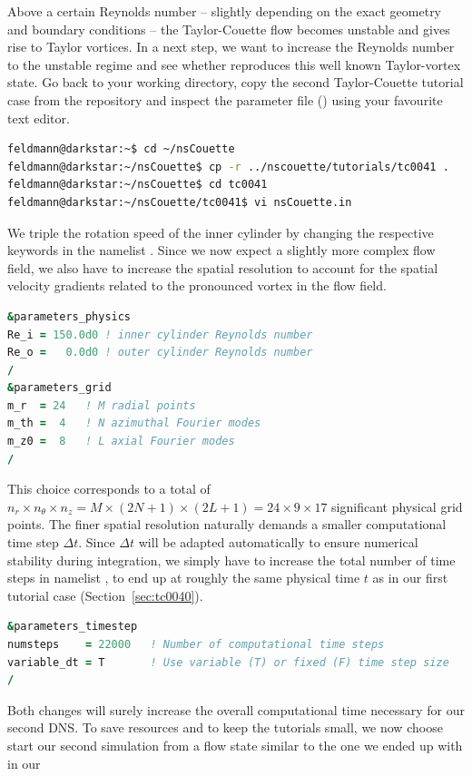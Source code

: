 \documentclass[a4paper, 11pt, DIV=11]{scrartcl}
\begin{document}
Above a certain Reynolds number -- slightly depending on the exact geometry and
boundary conditions -- the Taylor-Couette flow becomes unstable and gives rise
to Taylor vortices. In a next step, we want to increase the Reynolds number to
the unstable regime and see whether \nsc reproduces this well known Taylor-vortex
state. Go back to your working directory, copy the second Taylor-Couette tutorial
case from the repository and inspect the parameter file ()
using your favourite text editor.
\begin{lstlisting}[language=bash]
feldmann@darkstar:~$ cd ~/nsCouette
feldmann@darkstar:~/nsCouette$ cp -r ../nscouette/tutorials/tc0041 .
feldmann@darkstar:~/nsCouette$ cd tc0041
feldmann@darkstar:~/nsCouette/tc0041$ vi nsCouette.in
\end{lstlisting}
We triple the rotation speed of the inner cylinder by changing the respective
keywords in the namelist . Since we now expect a slightly
more complex flow field, we also have to increase the spatial resolution to
account for the spatial velocity gradients related to the pronounced vortex
in the flow field.
\begin{lstlisting}[language=Fortran]
&parameters_physics
Re_i = 150.0d0 ! inner cylinder Reynolds number
Re_o =   0.0d0 ! outer cylinder Reynolds number
/
&parameters_grid
m_r  = 24   ! M radial points
m_th =  4   ! N azimuthal Fourier modes
m_z0 =  8   ! L axial Fourier modes
/
\end{lstlisting}
This choice corresponds to a total of $n_r \times n_\theta  \times n_z=M \times
(2N+1) \times (2L+1) = \num{24} \times \num{9} \times \num{17}$ significant
physical grid points. The finer spatial resolution naturally demands a smaller
computational time step $\Delta t$. Since $\Delta t$ will be adapted automatically
to ensure numerical stability during integration, we simply have to increase the
total number of time steps in namelist , to end up at
roughly the same physical time $t$ as in our first tutorial case
(Section~\ref{sec:tc0040}).
\begin{lstlisting}[language=Fortran]
&parameters_timestep
numsteps    = 22000   ! Number of computational time steps
variable_dt = T       ! Use variable (T) or fixed (F) time step size
/
\end{lstlisting}
Both changes will
surely increase the overall computational time necessary for our second DNS.
To save resources and to keep the tutorials small, we now choose start our
second simulation from a flow state similar to the one we ended up with in our
\end{document}
